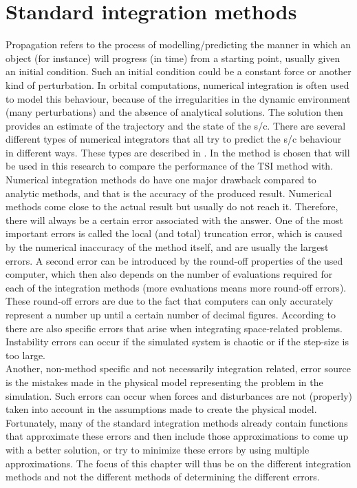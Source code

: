 \chapter{Standard integration methods}


\label{ch:standardIntegrationMethods}
Propagation refers to the process of modelling/predicting the manner in which an object (for instance) will progress (in time) from a starting point, usually given an initial condition. Such an initial condition could be a constant force or another kind of perturbation. In orbital computations, numerical integration is often used to model this behaviour, because of the irregularities in the dynamic environment (many perturbations) and the absence of analytical solutions. The solution then provides an estimate of the trajectory and the state of the \ac{s/c}\citep{hofsteenge2013}. There are several different types of numerical integrators that all try to predict the \ac{s/c} behaviour in different ways. These types are described in . In  the method is chosen that will be used in this research to compare the performance of the \ac{TSI} method with. \\
Numerical integration methods do have one major drawback compared to analytic methods, and that is the accuracy of the produced result. Numerical methods come close to the actual result but usually do not reach it. Therefore, there will always be a certain error associated with the answer. One of the most important errors is called the local (and total) truncation error, which is caused by the numerical inaccuracy of the method itself, and are usually the largest errors. A second error can be introduced by the round-off properties of the used computer, which then also depends on the number of evaluations required for each of the integration methods (more evaluations means more round-off errors). These round-off errors are due to the fact that computers can only accurately represent a number up until a certain number of decimal figures. According to \cite{milani1987} there are also specific errors that arise when integrating space-related problems. Instability errors can occur if the simulated system is chaotic or if the step-size is too large.\\
Another, non-method specific and not necessarily integration related, error source is the mistakes made in the physical model representing the problem in the simulation. Such errors can occur when forces and disturbances are not (properly) taken into account in the assumptions made to create the physical model.\\
Fortunately, many of the standard integration methods already contain functions that approximate these errors and then include those approximations to come up with a better solution, or try to minimize these errors by using multiple approximations. The focus of this chapter will thus be on the different integration methods and not the different methods of determining the different errors.

